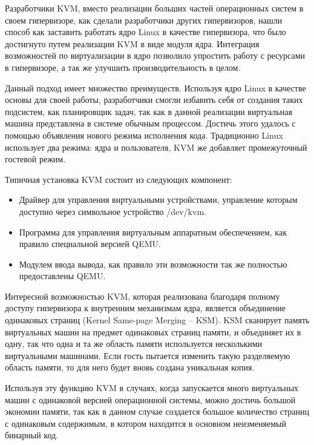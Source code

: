 Разработчики KVM, вместо реализации больших частей операционных систем в своем
гипервизоре, как сделали разработчики других гипервизоров, нашли способ как заставить
работать ядро Linux в качестве гипервизора, что было достигнуто путем реализации
KVM в виде модуля ядра. Интеграция возможностей по виртуализации в ядро позволило
упростить работу с ресурсами в гипервизоре, а так же улучшить производительность в целом.
 
Данный подход имеет множество преимуществ. Используя ядро Linux в качестве основы для
своей работы, разработчики смогли избавить себя от создания таких подсистем, как
планировщик задач, так как в данной реализации виртуальная машина представлена в системе
обычным процессом. Достичь этого удалось с помощью объявления нового режима исполнения 
кода. Традиционно Linux использует два режима: ядра и пользователя, KVM же добавляет 
промежуточный гостевой режим.
 
Типичная установка KVM состоит из следующих компонент:

\begin{itemize}
    \item Драйвер для управления виртуальными устройствами, управление которым доступно
    через символьное устройство /dev/kvm.
    \item Программа для управления виртуальным аппаратным обеспечением, как правило
    специальной версией QEMU.
    \item Модулем ввода вывода, как правило эти возможности так же полностью предоставлены
    QEMU.
\end{itemize}

Интересной возможностью KVM, которая реализована благодаря полному доступу гипервизора
к внутренним механизмам ядра, является объединение одинаковых страниц 
(Kernel Same-page Merging -- KSM). KSM сканирует память виртуальных машин на предмет
одинаковых страниц памяти, и объединяет их в одну, так что одна и та же область памяти
используется несколькими виртуальными машинами. Если гость пытается изменить такую 
разделяемую область памяти, то для него будет вновь создана уникальная копия.


Используя эту функцию KVM в случаях, когда запускается много виртуальных
машин с одинаковой версией операционной системы, можно достичь большой экономии 
памяти, так как в данном случае создается
большое количество страниц с одинаковым содержимым, в котором находится в основном
неизменяемый бинарный код.

